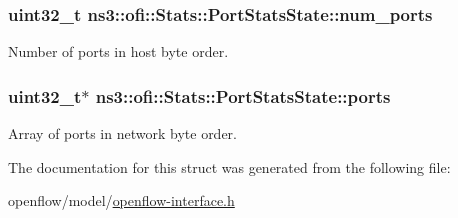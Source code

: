 \subsubsection[{\texorpdfstring{num\+\_\+ports}{num_ports}}]{\setlength{\rightskip}{0pt plus 5cm}uint32\+\_\+t ns3\+::ofi\+::\+Stats\+::\+Port\+Stats\+State\+::num\+\_\+ports}\hypertarget{structns3_1_1ofi_1_1Stats_1_1PortStatsState_ac207c5b26607e3fada57ce407c2c0a67}{}\label{structns3_1_1ofi_1_1Stats_1_1PortStatsState_ac207c5b26607e3fada57ce407c2c0a67}


Number of ports in host byte order. 

\subsubsection[{\texorpdfstring{ports}{ports}}]{\setlength{\rightskip}{0pt plus 5cm}uint32\+\_\+t$\ast$ ns3\+::ofi\+::\+Stats\+::\+Port\+Stats\+State\+::ports}\hypertarget{structns3_1_1ofi_1_1Stats_1_1PortStatsState_a559bdb1d51567a6045272e53ce209f94}{}\label{structns3_1_1ofi_1_1Stats_1_1PortStatsState_a559bdb1d51567a6045272e53ce209f94}


Array of ports in network byte order. 



The documentation for this struct was generated from the following file\+:\begin{DoxyCompactItemize}
\item 
openflow/model/\hyperlink{openflow-interface_8h}{openflow-\/interface.\+h}\end{DoxyCompactItemize}
